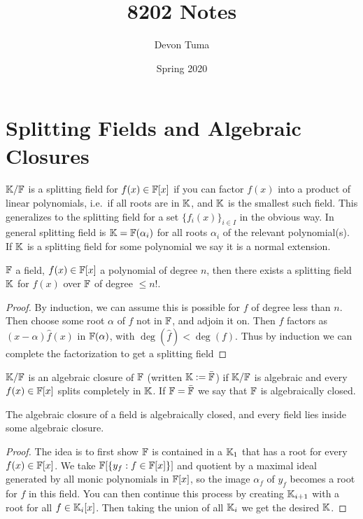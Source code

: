 \documentclass[11pt]{article}
\title{8202 Notes}
\author{Devon Tuma}
\date{Spring 2020}
\begin{document}
\maketitle

\section*{Splitting Fields and Algebraic Closures}

\begin{definition}
  $\mathbb{K}/\mathbb{F}$ is a splitting field for $f(x) \in \mathbb{F}[x]$ if you can factor $f(x)$ into a product of linear polynomials, i.e.\ if all roots are in $\mathbb{K}$, and $\mathbb{K}$ is the smallest such field.
  This generalizes to the splitting field for a set $\{f_i(x)\}_{i \in I}$ in the obvious way.
  In general splitting field is $\mathbb{K} = \mathbb{F}(\alpha_i)$ for all roots $\alpha_i$ of the relevant polynomial(s).
  If $\mathbb{K}$ is a splitting field for some polynomial we say it is a normal extension.
\end{definition}

\begin{theorem}
  $\mathbb{F}$ a field, $f(x) \in \mathbb{F}[x]$  a polynomial of degree $n$, then there exists a splitting field $\mathbb{K}$ for $f(x)$ over $\mathbb{F}$ of degree $\le n!$.
\end{theorem}
\begin{proof}
  By induction, we can assume this is possible for $f$ of degree less than $n$.
  Then choose some root $\alpha$ of $f$ not in $\mathbb{F}$, and adjoin it on.
  Then $f$ factors as $(x - \alpha)\hat{f}(x)$ in $\mathbb{F}(\alpha)$, with $\deg(\hat{f}) < \deg(f)$.
  Thus by induction we can complete the factorization to get a splitting field
\end{proof}

\begin{definition}
  $\mathbb{K}/\mathbb{F}$ is an algebraic closure of $\mathbb{F}$ (written $\mathbb{K} := \bar{\mathbb{F}}$) if $\mathbb{K}/\mathbb{F}$ is algebraic and every $f(x) \in \mathbb{F}[x]$ splits completely in $\mathbb{K}$.
  If $\mathbb{F} = \bar{\mathbb{F}}$ we say that $\mathbb{F}$ is algebraically closed.
\end{definition}

\begin{theorem}
  The algebraic closure of a field is algebraically closed, and every field lies inside some algebraic closure.
\end{theorem}
\begin{proof}
  The idea is to first show $\mathbb{F}$ is contained in a $\mathbb{K}_1$ that has a root for every $f(x) \in \mathbb{F}[x]$. We take $\mathbb{F}[\{y_f : f \in \mathbb{F}[x]\}]$ and quotient by a maximal ideal generated by all monic polynomials in $\mathbb{F}[x]$, so the image $\alpha_f$ of $y_f$ becomes a root for $f$ in this field. You can then continue this process by creating $\mathbb{K}_{i+1}$ with a root for all $f \in \mathbb{K}_i[x]$. Then taking the union of all $\mathbb{K}_i$ we get the desired $\mathbb{K}$.
\end{proof}
\end{document}
